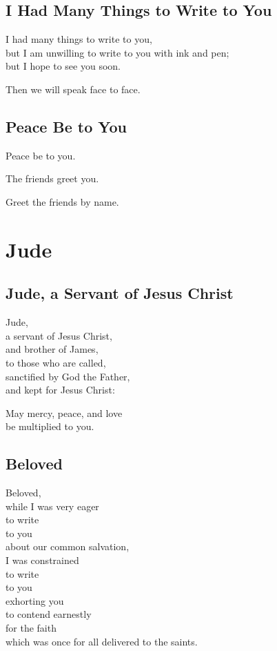 \documentclass[twoside, openany, 12pt]{extbook}
\newcommand{\tab}[1][0.5cm]{\hspace*{#1}}
\begin{document}
\newpage\section{I Had Many Things to Write to You}

I had many things to write to you,
\\
but I am unwilling to write to you with ink and pen;
\\
but I hope to see you soon.

Then we will speak face to face.

\newpage\section{Peace Be to You}

Peace be to you.

The friends greet you.

Greet the friends by name.
\chapter{Jude}

\newpage\section{Jude, a Servant of Jesus Christ}

Jude,
\\
a servant of Jesus Christ,
\\
and brother of James,
\\
to those who are called,
\\
sanctified by God the Father,
\\
and kept for Jesus Christ:

May mercy,
peace,
and love
\\
\tab
be multiplied to you.

\newpage\section{Beloved}

Beloved,
\\
while I was very eager
\\
\tab{}
to write
\\
\tab{}
\tab{}
to you
\\
\tab{}
\tab{}
\tab{}
about our common salvation,
\\
I was constrained
\\
\tab{}
to write
\\
\tab{}
\tab{}
to you
\\
\tab{}
\tab{}
\tab{}
exhorting you
\\
\tab{}
\tab{}
\tab{}
\tab{}
to contend earnestly
\\
\tab{}
\tab{}
\tab{}
\tab{}
\tab{}
for the faith
\\
\tab{}
\tab{}
\tab{}
\tab{}
\tab{}
\tab{}
which was once for all
delivered to the saints.
\end{document}
